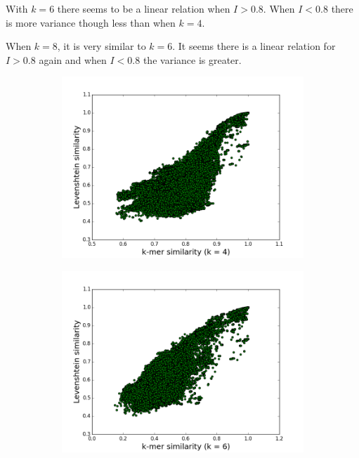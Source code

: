 With $k=6$ there seems to be a linear relation when $I>0.8$. When $I<0.8$ there
is more variance though less than when $k=4$.

When $k=8$, it is very similar to $k=6$. It seems there is a linear relation
for $I>0.8$ again and when $I<0.8$ the variance is greater.

\begin{figure}
  \begin{subfigure}[b]{0.5\textwidth}
    \includegraphics[scale=0.34]{graphics/k4.png}
  \end{subfigure}
  \begin{subfigure}[b]{0.5\textwidth}
    \includegraphics[scale=0.34]{graphics/k6.png}
  \end{subfigure}


\end{figure}
